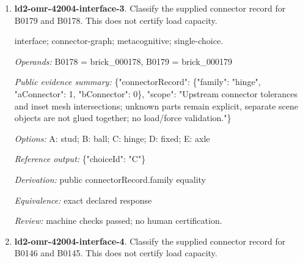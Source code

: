 \begin{enumerate}
\par{\small interface; connector-graph; metacognitive; single-choice.\par\textit{Operands:} B0240 = brick\_000240, B0239 = brick\_000239\par\textit{Public evidence summary:} \{"connectorRecord": \{"family": "fixed", "aConnector": 2, "bConnector": 1\}, "scope": "Upstream connector tolerances and inset mesh intersections; unknown parts remain explicit, separate scene objects are not glued together; no load/force validation."\}\par\textit{Options:} A: hinge; B: stud; C: axle; D: ball; E: fixed\par\textit{Reference output:} \{"choiceId": "E"\}\par\textit{Derivation:} public connectorRecord.family equality\par\textit{Equivalence:} exact declared response\par\textit{Review:} machine checks passed; no human certification.}
\item \textbf{ld2-omr-42004-interface-3}. Classify the supplied connector record for B0179 and B0178. This does not certify load capacity.
\par{\small interface; connector-graph; metacognitive; single-choice.\par\textit{Operands:} B0178 = brick\_000178, B0179 = brick\_000179\par\textit{Public evidence summary:} \{"connectorRecord": \{"family": "hinge", "aConnector": 1, "bConnector": 0\}, "scope": "Upstream connector tolerances and inset mesh intersections; unknown parts remain explicit, separate scene objects are not glued together; no load/force validation."\}\par\textit{Options:} A: stud; B: ball; C: hinge; D: fixed; E: axle\par\textit{Reference output:} \{"choiceId": "C"\}\par\textit{Derivation:} public connectorRecord.family equality\par\textit{Equivalence:} exact declared response\par\textit{Review:} machine checks passed; no human certification.}
\item \textbf{ld2-omr-42004-interface-4}. Classify the supplied connector record for B0146 and B0145. This does not certify load capacity.

\end{enumerate}
